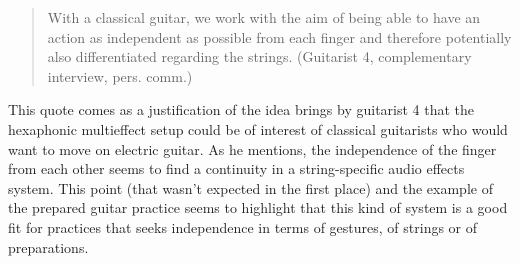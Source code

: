 \documentclass{article}
\begin{document}
\begin{quote}
With a classical guitar, we work with the aim of being able to have an action as independent as possible from each finger and therefore potentially also differentiated regarding the strings. (Guitarist 4, complementary interview, pers. comm.)
\end{quote}

This quote comes as a justification of the idea brings by guitarist 4 that the hexaphonic multieffect setup could be of interest of classical guitarists who would want to move on electric guitar. As he mentions, the independence of the finger from each other seems to find a continuity in a string-specific audio effects system. This point (that wasn't expected in the first place) and the example of the prepared guitar practice seems to highlight that this kind of system is a good fit for practices that seeks independence in terms of gestures, of strings or of preparations.

%


\end{document}
